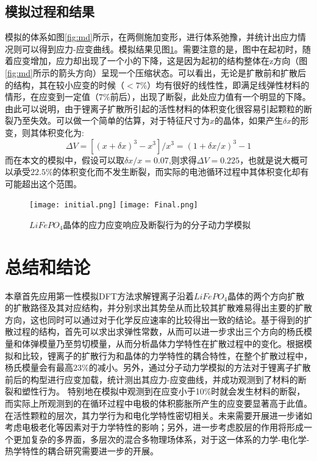 \subsection{模拟过程和结果}
模拟的体系如图\ref{fig:md}所示，在两侧施加变形，进行体系弛豫，并统计出应力情况则可以得到应力-应变曲线。模拟结果见图\ref{fig:md_result}。需要注意的是，图中在起初时，随着应变增加，应力却出现了一个小的下降，这是因为起初的结构整体在z方向（图\ref{fig:md}所示的箭头方向）呈现一个压缩状态。可以看出，无论是扩散前和扩散后的结构，其在较小应变的时候（$<7\%$）均有很好的线性性，即满足线弹性材料的情形，在应变到一定值（$7\%$前后），出现了断裂，此处应力值有一个明显的下降。由此可以说明，由于锂离子扩散所引起的活性材料的体积变化很容易引起颗粒的断裂乃至失效。可以做一个简单的估算，对于特征尺寸为$x$的晶体，如果产生$\delta x$的形变，则其体积变化为:
\begin{equation}
\Delta V = [(x+\delta x)^3 - x^3]/x^3 = (1+ \delta x/x)^3 -1
\end{equation}
而在本文的模拟中，假设可以取$\delta x/x = 0.07$,则求得$\Delta V=0.225$，也就是说大概可以承受$22.5\%$的体积变化而不发生断裂，而实际的电池循环过程中其体积变化却有可能超出这个范围\cite{Zhang2017Chemomechanical}。

\begin{figure}
	\centering   
	\texttt{[image: initial.png]}
	\texttt{[image: Final.png]}
	\caption{$LiFePO_4$晶体的应力应变响应及断裂行为的分子动力学模拟} 
	\label{fig:md_result}
\end{figure}

\section{总结和结论}
本章首先应用第一性模拟DFT方法求解锂离子沿着$LiFePO_4$晶体的两个方向扩散的扩散路径及其对应结构，并分别求出其势垒从而比较其扩散难易得出主要的扩散方向，这也同时可以通过对于化学反应速率的比较得出一致的结论。基于得到的扩散过程的结构，首先可以求出求弹性常数，从而可以进一步求出三个方向的杨氏模量和体弹模量乃至剪切模量，从而分析晶体力学特性在扩散过程中的变化。根据模拟和比较，锂离子的扩散行为和晶体的力学特性的耦合特性，在整个扩散过程中，杨氏模量会有最高$23\%$的减小。另外，通过分子动力学模拟的方法对于锂离子扩散前后的构型进行应变加载，统计测出其应力-应变曲线，并成功观测到了材料的断裂和塑性行为。 特别地在模拟中观测到在应变小于10\%时就会发生材料的断裂，而实际上所观测到的在循环过程中电极的体积膨胀所产生的应变要显著高于此值。\\
\indent 在活性颗粒的层次，其力学行为和电化学特性密切相关。未来需要开展进一步诸如考虑电极老化等因素对于力学特性的影响；另外，进一步考虑胶层的作用将形成一个更加复杂的多界面，多层次的混合多物理场体系，对于这一体系的力学-电化学-热学特性的耦合研究需要进一步的开展。